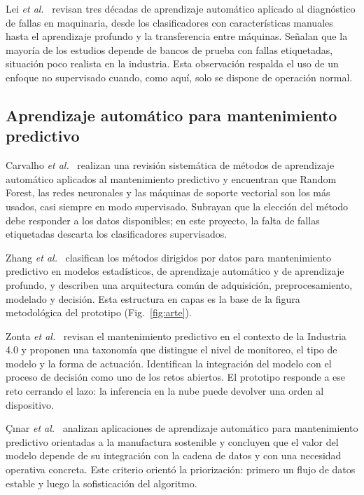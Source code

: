 \documentclass[10pt,twocolumn]{article}
\begin{document}
Lei \emph{et al.}~\cite{lei2020} revisan tres décadas de aprendizaje automático aplicado al
diagnóstico de fallas en maquinaria, desde los clasificadores con características manuales hasta
el aprendizaje profundo y la transferencia entre máquinas. Señalan que la mayoría de los estudios
depende de bancos de prueba con fallas etiquetadas, situación poco realista en la industria. Esta
observación respalda el uso de un enfoque no supervisado cuando, como aquí, solo se dispone de
operación normal.

\subsection{Aprendizaje automático para mantenimiento predictivo}

Carvalho \emph{et al.}~\cite{carvalho2019} realizan una revisión sistemática de métodos de
aprendizaje automático aplicados al mantenimiento predictivo y encuentran que Random Forest, las
redes neuronales y las máquinas de soporte vectorial son los más usados, casi siempre en modo
supervisado. Subrayan que la elección del método debe responder a los datos disponibles; en este
proyecto, la falta de fallas etiquetadas descarta los clasificadores supervisados.

Zhang \emph{et al.}~\cite{zhang2019} clasifican los métodos dirigidos por datos para mantenimiento
predictivo en modelos estadísticos, de aprendizaje automático y de aprendizaje profundo, y
describen una arquitectura común de adquisición, preprocesamiento, modelado y decisión. Esta
estructura en capas es la base de la figura metodológica del prototipo (Fig.~\ref{fig:arte}).

Zonta \emph{et al.}~\cite{zonta2020} revisan el mantenimiento predictivo en el contexto de la
Industria 4.0 y proponen una taxonomía que distingue el nivel de monitoreo, el tipo de modelo y la
forma de actuación. Identifican la integración del modelo con el proceso de decisión como uno de
los retos abiertos. El prototipo responde a ese reto cerrando el lazo: la inferencia en la nube
puede devolver una orden al dispositivo.

Çınar \emph{et al.}~\cite{cinar2020} analizan aplicaciones de aprendizaje automático para
mantenimiento predictivo orientadas a la manufactura sostenible y concluyen que el valor del
modelo depende de su integración con la cadena de datos y con una necesidad operativa concreta.
Este criterio orientó la priorización: primero un flujo de datos estable y luego la sofisticación
del algoritmo.
\end{document}
